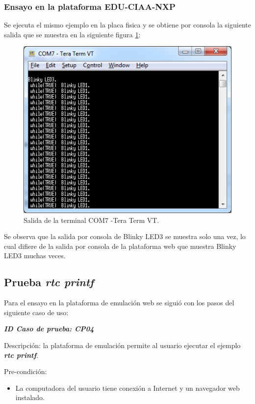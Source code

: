 \subsubsection{Ensayo en la plataforma EDU-CIAA-NXP} 

Se ejecuta el mismo ejemplo en la placa fisica y se obtiene por consola la siguiente salida que se muestra en la siguiente figura \ref{fig:TesttickhookPlaca}:



\begin{figure}[ht]
	\centering
	\includegraphics[scale=.80]{./Figures/TesttickhookPlaca.png}
	\caption{Salida de la terminal COM7 -Tera Term VT.}
	\label{fig:TesttickhookPlaca}
\end{figure}

Se observa que la salida por consola de \textquotedbl Blinky LED3 \textquotedbl se muestra solo una vez, lo cual difiere de la salida por consola de la plataforma web que muestra \textquotedbl Blinky LED3 \textquotedbl muchas veces.

\subsection{ Prueba \textit{\textbf{rtc printf}}}

Para el ensayo en la plataforma de emulación web se siguió con los pasos del siguiente caso de uso:

\textit{\textbf{ID Caso de prueba: CP04}}

Descripción: la plataforma de emulación permite al usuario ejecutar el ejemplo \textit{\textbf{rtc printf}}.

Pre-condición: 
\begin{itemize}
	\item La computadora del usuario tiene conexión a Internet y un navegador web instalado.
\end{itemize}


